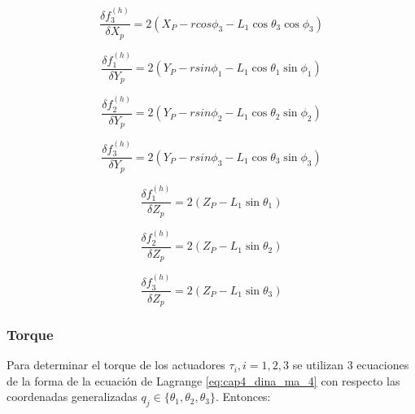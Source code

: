             \begin{FlushLeft}
             \[ \frac{ \delta f_{3}^{ \left( h \right) }}{ \delta X_{p}}=2 \left( X_{P}- rcos \phi _{3}-L_{1}\cos  \theta _{3}\cos  \phi _{3} \right)  \] 
            \end{FlushLeft}\par
            
            \begin{FlushLeft}
             \[ \frac{ \delta f_{1}^{ \left( h \right) }}{ \delta Y_{p}}=2 \left( Y_{P}- rsin \phi _{1}-L_{1}\cos  \theta _{1}\sin  \phi _{1} \right)  \] 
            \end{FlushLeft}\par
            
            \begin{FlushLeft}
             \[ \frac{ \delta f_{2}^{ \left( h \right) }}{ \delta Y_{p}}=2 \left( Y_{P}- rsin \phi _{2}-L_{1}\cos  \theta _{2}\sin  \phi _{2} \right)  \] 
            \end{FlushLeft}\par
            
             \[ \frac{ \delta f_{3}^{ \left( h \right) }}{ \delta Y_{p}}=2 \left( Y_{P}- rsin \phi _{3}-L_{1}\cos  \theta _{3}\sin  \phi _{3} \right)  \] \par
            
             \[ \frac{ \delta f_{1}^{ \left( h \right) }}{ \delta Z_{p}}=2 \left( Z_{P}-L_{1}\sin  \theta _{1} \right)  \] \par
            
             \[ \frac{ \delta f_{2}^{ \left( h \right) }}{ \delta Z_{p}}=2 \left( Z_{P}-L_{1}\sin  \theta _{2} \right)  \] \par
            
             \[ \frac{ \delta f_{3}^{ \left( h \right) }}{ \delta Z_{p}}=2 \left( Z_{P}-L_{1}\sin  \theta _{3} \right)  \] \par
            
            
            
      \newpage

            \subsubsection{Torque}
            Para determinar el torque de los actuadores $\tau_i, i=1,2,3$ se utilizan 3 ecuaciones de la forma de la ecuación de Lagrange \ref{eq:cap4_dina_ma_4} con respecto las coordenadas generalizadas $q_j \in \{\theta_1,\theta_2,\theta_3\}$. Entonces:

